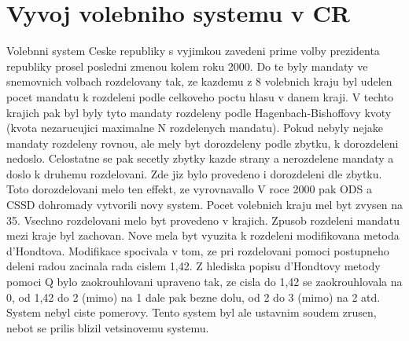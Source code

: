 \documentclass[12pt,a4paper]{article}
\begin{document}
\section{Vyvoj volebniho systemu v CR}
Volebnni system Ceske republiky s vyjimkou zavedeni prime volby prezidenta republiky prosel posledni zmenou kolem roku 2000.
Do te byly mandaty ve snemovnich volbach rozdelovany tak, ze kazdemu z 8 volebnich kraju byl udelen pocet mandatu k rozdeleni podle celkoveho poctu hlasu v danem kraji.
V techto krajich pak byl byly tyto mandaty rozdeleny podle Hagenbach-Bishoffovy kvoty (kvota nezarucujici maximalne N rozdelenych mandatu).
Pokud nebyly nejake mandaty rozdeleny rovnou, ale mely byt dorozdeleny podle zbytku, k dorozdeleni nedoslo.
Celostatne se pak secetly zbytky kazde strany a nerozdelene mandaty a doslo k druhemu rozdelovani.
Zde jiz bylo provedeno i dorozdeleni dle zbytku.
Toto dorozdelovani melo ten effekt, ze vyrovnavallo %
V roce 2000 pak ODS a CSSD dohromady vytvorili novy system.
Pocet volebnich kraju mel byt zvysen na 35.
Vsechno rozdelovani melo byt provedeno v krajich.
Zpusob rozdeleni mandatu mezi kraje byl zachovan.
Nove mela byt vyuzita k rozdeleni modifikovana metoda d'Hondtova.
Modifikace spocivala v tom, ze pri rozdelovani pomoci postupneho deleni radou zacinala rada cislem 1,42.
Z hlediska popisu d'Hondtovy metody pomoci Q bylo zaokrouhlovani upraveno tak, ze cisla do 1,42 se zaokrouhlovala na 0, od 1,42 do 2 (mimo) na 1 dale pak bezne dolu, od 2 do 3 (mimo) na 2 atd.
System nebyl ciste pomerovy.
Tento system byl ale ustavnim soudem zrusen, nebot se prilis blizil vetsinovemu systemu.  
\end{document}
